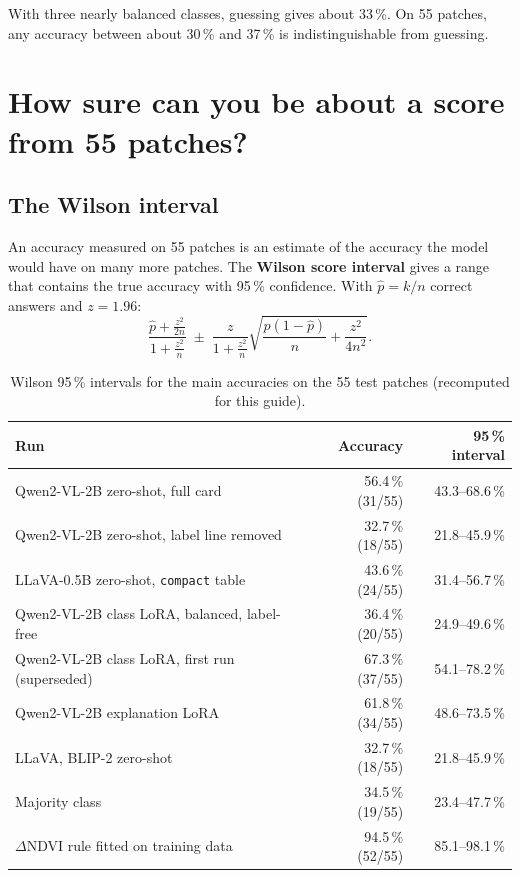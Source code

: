 \begin{plainwords}
With three nearly balanced classes, guessing gives about 33\,\%. On 55 patches, any accuracy between about 30\,\% and 37\,\% is indistinguishable from guessing.
\end{plainwords}

\section{How sure can you be about a score from 55 patches?}

\subsection{The Wilson interval}

An accuracy measured on 55 patches is an estimate of the accuracy the model would have on many more patches. The \textbf{Wilson score interval} \citep{wilson1927} gives a range that contains the true accuracy with 95\,\% confidence. With $\hat p = k/n$ correct answers and $z = 1.96$:
\begin{equation}
\frac{\hat p + \frac{z^2}{2n}}{1+\frac{z^2}{n}} \;\pm\; \frac{z}{1+\frac{z^2}{n}}\sqrt{\frac{\hat p(1-\hat p)}{n} + \frac{z^2}{4n^2}} .
\label{eq:wilson}
\end{equation}

\begin{table}[H]
\centering
\caption{Wilson 95\,\% intervals for the main accuracies on the 55 test patches (recomputed for this guide).}
\label{tab:wilson}
\begin{tabular}{lrr}
\toprule
Run & Accuracy & 95\,\% interval \\
\midrule
Qwen2-VL-2B zero-shot, full card & 56.4\,\% (31/55) & 43.3--68.6\,\% \\
Qwen2-VL-2B zero-shot, label line removed & 32.7\,\% (18/55) & 21.8--45.9\,\% \\
LLaVA-0.5B zero-shot, \texttt{compact} table & 43.6\,\% (24/55) & 31.4--56.7\,\% \\
Qwen2-VL-2B class LoRA, balanced, label-free & 36.4\,\% (20/55) & 24.9--49.6\,\% \\
Qwen2-VL-2B class LoRA, first run (superseded) & 67.3\,\% (37/55) & 54.1--78.2\,\% \\
Qwen2-VL-2B explanation LoRA & 61.8\,\% (34/55) & 48.6--73.5\,\% \\
LLaVA, BLIP-2 zero-shot & 32.7\,\% (18/55) & 21.8--45.9\,\% \\
Majority class & 34.5\,\% (19/55) & 23.4--47.7\,\% \\
$\Delta$NDVI rule fitted on training data & 94.5\,\% (52/55) & 85.1--98.1\,\% \\
\bottomrule
\end{tabular}
\end{table}

